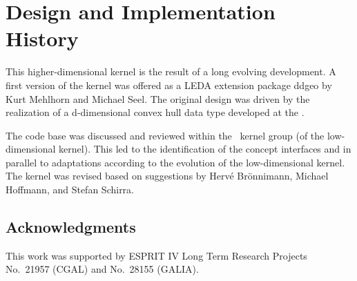 \section{Design and Implementation History}

This higher-dimensional kernel is the result of a long evolving
development. A first version of the kernel was offered as a LEDA
extension package ddgeo by Kurt Mehlhorn and Michael Seel. The
original design was driven by the realization of a d-dimensional
convex hull data type developed at the 
.

The code base was discussed and reviewed within the \cgal\ kernel group
(of the low-dimensional kernel).  This led to the identification of
the concept interfaces and in parallel to adaptations according to the
evolution of the low-dimensional kernel.  The kernel was revised
based on suggestions by Herv\'e Br\"onnimann, Michael Hoffmann, and
Stefan Schirra.

\subsection{Acknowledgments}

This work was supported by ESPRIT IV Long Term Research Projects
No.~21957 (CGAL) and No.~28155 (GALIA).
